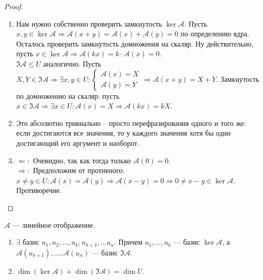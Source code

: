 \begin{proof}
    \begin{enumerate}
        \item Нам нужно собственно проверить замкнутость $\ker \mathcal{A}$. Пусть $x, y \in \ker \mathcal{A} \Rightarrow \mathcal{A}(x + y) = \mathcal{A}(x) + \mathcal{A}(y) = 0$ по определению ядра. Осталось проверить замкнутость домножения на скаляр. Ну действительно, пусть $x \in \ker \mathcal{A} \Rightarrow \mathcal{A}(kx) = k \cdot \mathcal{A}(x) = 0$.\\
        $\Im \mathcal{A} \le U$ аналогично. Пусть $X, Y \in \Im \mathcal{A} \Rightarrow \exists x, y \in U : \begin{cases}\mathcal{A}(x) = X\\
        \mathcal{A}(y) = Y\end{cases} \Rightarrow \mathcal{A}(x + y) = X + Y$. Замкнутость по домножению на скаляр: пусть $x \in \Im \mathcal{A} \Rightarrow \exists x \in U : \mathcal{A}(x) = X \Rightarrow \mathcal{A}(kx) = kX$. 
        \item Это абсолютно тривиально -- просто перефразирования одного и того же: если достигаются все значения, то у каждого значения хотя бы один достигающий его аргумент и наоборот.
        \item $\Leftarrow\!:$ Очевидно, так как тогда только $\mathcal{A}(0) = 0$.\\
        $\Rightarrow\!:$ Предположим от противного: $x \neq y \in U : \mathcal{A}(x) = \mathcal{A}(y) \Rightarrow \mathcal{A}(x - y) = 0 \Rightarrow 0 \neq x - y \in \ker \mathcal{A}$. Противоречие.
    \end{enumerate}
\end{proof}
\begin{theorem}
    $\mathcal{A}$ --- линейное отображение.
    \begin{enumerate}
        \item $\exists$ базис  $u_1, u_2, \ldots, u_k, u_{k+1}, \ldots u_n$. Причем $u_1, \ldots, u_k$ --- базис $\ker \mathcal{A}$, а  $\mathcal{A}(u_{k+1}), \ldots, \mathcal{A}(u_n)$ --- базис $\Im \mathcal{A}$.
        \item  $\dim (\ker \mathcal{A}) + \dim (\Im \mathcal{A}) = \dim U$.
    \end{enumerate}
\end{theorem}
